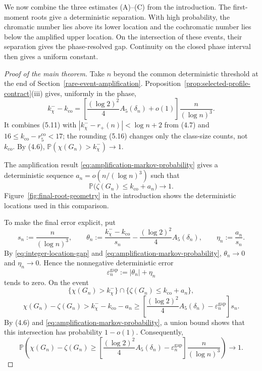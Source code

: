 \documentclass[a4paper,10pt,reqno]{amsart}
\numberwithin{equation}{section}
\theoremstyle{plain}
\theoremstyle{remark}
\begin{document}
We now combine the three estimates (A)--(C) from the introduction.
The first-moment roots give a deterministic separation. With high
probability, the chromatic number lies above its lower location and the
cochromatic number lies below the amplified upper location. On the
intersection of these events, their separation gives the phase-resolved
gap. Continuity on the closed phase interval then gives a uniform
constant.

\begin{proof}[Proof of the main theorem]

Take $n$ beyond the common deterministic threshold at the end of
Section~\ref{rare-event-amplification}.
Proposition~\ref{prop:selected-profile-contract}(iii) gives, uniformly in
the phase,
\begin{equation}
  k_\chi^- - k_{\mathrm{co}}
  =\left[\frac{(\log 2)^2}{4}A_5(\delta_n)+o(1)\right]\frac{n}{(\log n)^3}.
  \label{eq:integer-location-gap}
\end{equation}
It combines (5.11) with $|k_\chi^- -r_+(n)|<\log n+2$ from (4.7) and
$16\le k_{\mathrm{co}}-r_5^{\mathrm{co}}<17$; the rounding (5.16) changes
only the class-size counts, not $k_{\mathrm{co}}$. By (4.6),
$\mathbb P(\chi(G_n)>k_\chi^-)\to1$.

The amplification result \eqref{eq:amplification-markov-probability} gives a deterministic sequence
$a_n=o(n/(\log n)^3)$ such that
\[
  \mathbb P\bigl(\zeta(G_n)\le k_{\mathrm{co}}+a_n\bigr)
  \longrightarrow1.
\]
Figure~\ref{fig:final-root-geometry} in the introduction shows the
deterministic locations used in this comparison.

To make the final error explicit, put
\[
  s_n:=\frac{n}{(\log n)^3},\qquad
  \theta_n:=\frac{k_\chi^- - k_{\mathrm{co}}}{s_n}
  -\frac{(\log 2)^2}{4}A_5(\delta_n),\qquad
  \eta_n:=\frac{a_n}{s_n}.
\]
By \eqref{eq:integer-location-gap} and \eqref{eq:amplification-markov-probability},
$\theta_n\to0$ and $\eta_n\to0$.  Hence the nonnegative deterministic error
\[
  \varepsilon_n^{\mathrm{gap}}:=|\theta_n|+\eta_n
\]
tends to zero. On the event
\[
  \{\chi(G_n)>k_\chi^-\}
  \cap
  \{\zeta(G_n)\le k_{\mathrm{co}}+a_n\},
\]
\[
  \chi(G_n)-\zeta(G_n)
  > k_\chi^- - k_{\mathrm{co}}-a_n
  \ge
  \left[
    \frac{(\log 2)^2}{4}A_5(\delta_n)
    -\varepsilon_n^{\mathrm{gap}}
  \right]s_n.
\]
By (4.6) and \eqref{eq:amplification-markov-probability}, a union bound shows that this intersection has
probability $1-o(1)$. Consequently,
\begin{equation}
  \mathbb P\!\left(
    \chi(G_n)-\zeta(G_n)
    \ge
    \left[
      \frac{(\log 2)^2}{4}A_5(\delta_n)
      -\varepsilon_n^{\mathrm{gap}}
    \right]
    \frac{n}{(\log n)^3}
  \right)
  \longrightarrow1.
  \label{eq:phase-resolved-final}
\end{equation}


\end{proof}
\end{document}
